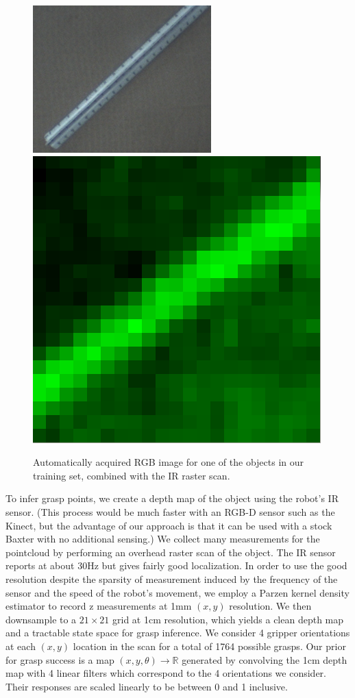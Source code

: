 \documentclass{article}
\begin{document}
\begin{figure}
\includegraphics[width=0.4\linewidth]{figures/ruler_rgb.png}
\includegraphics[width=0.4\linewidth]{figures/ruler_ir.png}
\caption{Automatically acquired RGB image for one of the objects in our
  training set, combined with the IR raster scan.\label{fig:ir}}
\end{figure}

To infer grasp points, we create a depth map of the object using the
robot's IR sensor.  (This process would be much faster with an RGB-D
sensor such as the Kinect, but the advantage of our approach is that
it can be used with a stock Baxter with no additional sensing.)  We
collect many measurements for the pointcloud by performing an overhead
raster scan of the object. The IR sensor reports at about 30Hz but
gives fairly good localization.  In order to use the good resolution
despite the sparsity of measurement induced by the frequency of the
sensor and the speed of the robot's movement, we employ a Parzen
kernel density estimator to record z measurements at 1mm $(x,y)$
resolution. We then downsample to a $21 \times 21$ grid at 1cm
resolution, which yields a clean depth map and a tractable state space
for grasp inference. We consider 4 gripper orientations at each
$(x,y)$ location in the scan for a total of 1764 possible grasps. Our
prior for grasp success is a map $(x,y,\theta) \rightarrow \mathbb{R}$
generated by convolving the 1cm depth map with 4 linear filters which
correspond to the 4 orientations we consider. Their responses are
scaled linearly to be between 0 and 1 inclusive.
\end{document}
